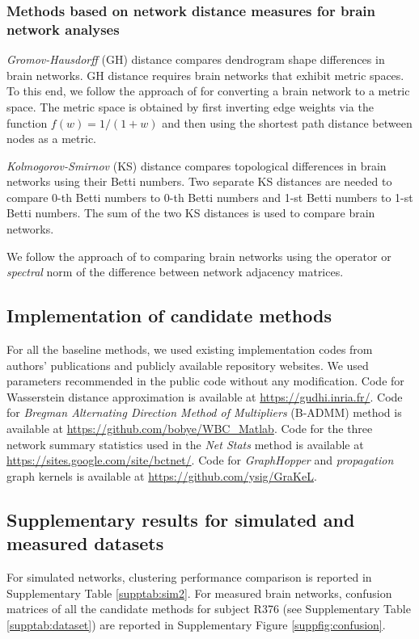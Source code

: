 \documentclass{article} %
\begin{document}
\subsubsection*{Methods based on network distance measures for brain network analyses}
{\em Gromov-Hausdorff} (GH) distance \citep{lee2012persistent} compares dendrogram shape differences in brain networks. GH distance requires brain networks that exhibit metric spaces. To this end, we follow the approach of \citet{otter2017roadmap} for converting a brain network to a metric space. The metric space is obtained by first inverting edge weights via the function $f(w)=1/(1+w)$ and then using the shortest path distance between nodes as a metric.

{\em Kolmogorov-Smirnov} (KS) distance \citep{chung2019exact} compares topological differences in brain networks using their Betti numbers. Two separate KS distances are needed to compare 0-th Betti numbers to 0-th Betti numbers and 1-st Betti numbers to 1-st Betti numbers. The sum of the two KS distances is used to compare brain networks.

We follow the approach of \citet{banks2020cortical} to comparing brain networks using the operator or {\em spectral} norm of the difference between network adjacency matrices.


\subsection{Implementation of candidate methods}
For all the baseline methods, we used existing implementation codes from authors’ publications and publicly available repository websites. We used parameters recommended in the public code without any modification.
Code for Wasserstein distance approximation \citep{Lacombe2018LargeSC} is available at \url{https://gudhi.inria.fr/}. Code for {\em Bregman Alternating Direction Method of Multipliers} (B-ADMM) method \citep{ye2017fast} is available at \url{https://github.com/bobye/WBC_Matlab}. Code for the three network summary statistics used in the {\em Net Stats} method is available at \url{https://sites.google.com/site/bctnet/}. Code for {\em GraphHopper} and {\em propagation} graph kernels is available at \url{https://github.com/ysig/GraKeL}.


\subsection{Supplementary results for simulated and measured datasets} 
For simulated networks, clustering performance comparison is reported in Supplementary Table \ref{supptab:sim2}. For measured brain networks, confusion matrices of all the candidate methods for subject R376 (see Supplementary Table \ref{supptab:dataset}) are reported in Supplementary Figure \ref{suppfig:confusion}.
\end{document}
